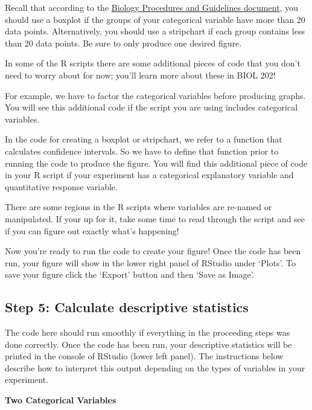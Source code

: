 \documentclass[
]{book}
\begin{document}
Recall that according to the \href{https://ubco-biology.github.io/Procedures-and-Guidelines/figures.html}{Biology Procedures and Guidelines document}, you should use a boxplot if the groups of your categorical variable have more than 20 data points. Alternatively, you should use a stripchart if each group contains less than 20 data points. Be sure to only produce one desired figure.

In some of the R scripts there are some additional pieces of code that you don't need to worry about for now; you'll learn more about these in BIOL 202!

For example, we have to factor the categorical variables before producing graphs. You will see this additional code if the script you are using includes categorical variables.

In the code for creating a boxplot or stripchart, we refer to a function that calculates confidence intervals. So we have to define that function prior to running the code to produce the figure. You will find this additional piece of code in your R script if your experiment has a categorical explanatory variable and quantitative response variable.

There are some regions in the R scripts where variables are re-named or manipulated. If your up for it, take some time to read through the script and see if you can figure out exactly what's happening!

Now you're ready to run the code to create your figure! Once the code has been run, your figure will show in the lower right panel of RStudio under `Plots'. To save your figure click the `Export' button and then `Save as Image'.

\hypertarget{step-5-calculate-descriptive-statistics}{%
\subsection*{Step 5: Calculate descriptive statistics}\label{step-5-calculate-descriptive-statistics}}

The code here should run smoothly if everything in the proceeding steps was done correctly. Once the code has been run, your descriptive statistics will be printed in the console of RStudio (lower left panel). The instructions below describe how to interpret this output depending on the types of variables in your experiment.

\textbf{Two Categorical Variables}
\end{document}
